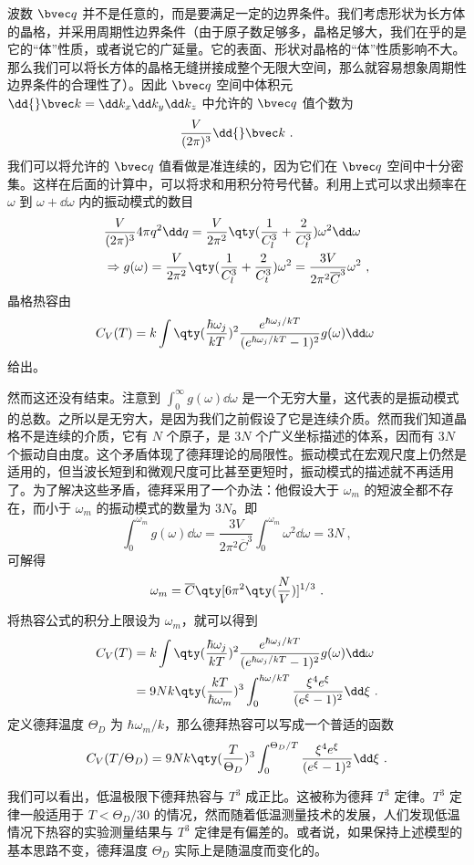 波数 $\bvec q$ 并不是任意的，而是要满足一定的边界条件。我们考虑形状为长方体的晶格，并采用周期性边界条件（由于原子数足够多，晶格足够大，我们在乎的是它的“体”性质，或者说它的广延量。它的表面、形状对晶格的“体”性质影响不大。那么我们可以将长方体的晶格无缝拼接成整个无限大空间，那么就容易想象周期性边界条件的合理性了）。因此 $\bvec q$ 空间中体积元 $\dd{} \bvec k=\dd k_x\dd k_y\dd k_z$ 中允许的 $\bvec q$ 值个数为
\begin{equation}
\frac{V}{(2\pi)^3} \dd{} \bvec k~.
\end{equation}
我们可以将允许的 $\bvec q$ 值看做是准连续的，因为它们在 $\bvec q$ 空间中十分密集。这样在后面的计算中，可以将求和用积分符号代替。利用上式可以求出频率在 $\omega$ 到 $\omega+\dd \omega$ 内的振动模式的数目
\begin{equation}
\begin{aligned}
&\frac{V}{(2\pi)^3}4\pi q^2\dd q=\frac{V}{2\pi^2}\qty(\frac{1}{C_l^3}+\frac{2}{C_t^3})\omega^2\dd \omega\\
&\Rightarrow g(\omega)= \frac{V}{2\pi^2}\qty(\frac{1}{C_l^3}+\frac{2}{C_t^3}) \omega^2=\frac{3V}{2\pi^2 \overline C ^3} \omega^2~,
\end{aligned}
\end{equation}
晶格热容由
\begin{equation}
C_V(T)=k \int \qty(\frac{\hbar\omega_j}{kT})^2\frac{e^{\hbar \omega_j/kT}}{(e^{\hbar\omega_j/kT}-1)^2} g(\omega)\dd \omega~
\end{equation}
给出。

然而这还没有结束。注意到 $\int_0^\infty g(\omega)\dd \omega$ 是一个无穷大量，这代表的是振动模式的总数。之所以是无穷大，是因为我们之前假设了它是连续介质。然而我们知道晶格不是连续的介质，它有 $N$ 个原子，是 $3N$ 个广义坐标描述的体系，因而有 $3N$ 个振动自由度。这个矛盾体现了德拜理论的局限性。振动模式在宏观尺度上仍然是适用的，但当波长短到和微观尺度可比甚至更短时，振动模式的描述就不再适用了。为了解决这些矛盾，德拜采用了一个办法：他假设大于 $\omega_m$ 的短波全都不存在，而小于 $\omega_m$ 的振动模式的数量为 $3N$。即
\begin{equation}
\int_0^{\omega_m} g(\omega)\dd \omega = \frac{3V}{2\pi^2\overline C^3}\int_0^{\omega_m}\omega^2\dd \omega =3N~,
\end{equation}
可解得
\begin{equation}
\omega_m = \overline C \qty[6\pi^2 \qty(\frac{N}{V})]^{1/3}~.
\end{equation}
将热容公式的积分上限设为 $\omega_m$，就可以得到
\begin{equation}
\begin{aligned}
C_V(T)&=k \int \qty(\frac{\hbar\omega_j}{kT})^2\frac{e^{\hbar \omega_j/kT}}{(e^{\hbar\omega_j/kT}-1)^2} g(\omega)\dd \omega\\
&=9Nk\qty(\frac{kT}{\hbar\omega_m})^3 \int_0^{\hbar\omega/kT} \frac{\xi^4 e^\xi}{(e^\xi-1)^2}\dd \xi~.
\end{aligned}
\end{equation}
定义德拜温度 $\Theta_D$ 为 $\hbar\omega_m/k$，那么德拜热容可以写成一个普适的函数
\begin{equation}
C_V(T/\Theta_D)=9Nk\qty(\frac{T}{\Theta_D})^3 \int_0^{\Theta_D/T}\frac{\xi^4 e^{\xi}}{(e^\xi-1)^2}\dd \xi~.
\end{equation}

我们可以看出，低温极限下德拜热容与 $T^3$ 成正比。这被称为德拜 $T^3$ 定律。$T^3$ 定律一般适用于 $T<\Theta_D/30$ 的情况，然而随着低温测量技术的发展，人们发现低温情况下热容的实验测量结果与 $T^3$ 定律是有偏差的。或者说，如果保持上述模型的基本思路不变，德拜温度 $\Theta_D$ 实际上是随温度而变化的。
